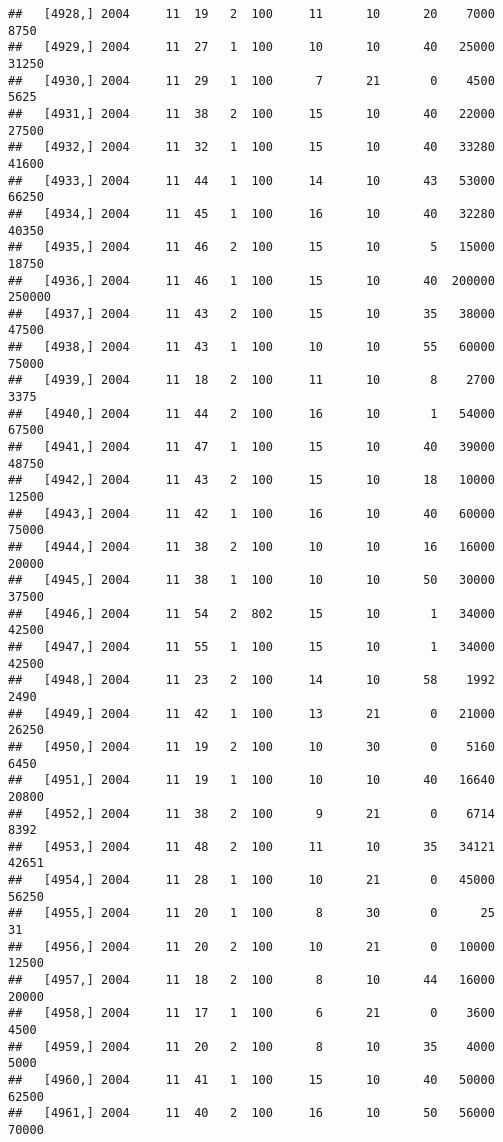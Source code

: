 \documentclass{article}\usepackage[]{graphicx}\usepackage[]{color}
\makeatletter
\newenvironment{kframe}{%
 \def\at@end@of@kframe{}%
 \ifinner\ifhmode%
  \def\at@end@of@kframe{\end{minipage}}%
  \begin{minipage}{\columnwidth}%
 \fi\fi%
 \def\FrameCommand##1{\hskip\@totalleftmargin \hskip-\fboxsep
 \colorbox{shadecolor}{##1}\hskip-\fboxsep
     \hskip-\linewidth \hskip-\@totalleftmargin \hskip\columnwidth}%
 \MakeFramed {\advance\hsize-\width
   \@totalleftmargin\z@ \linewidth\hsize
   \@setminipage}}%
 {\par\unskip\endMakeFramed%
 \at@end@of@kframe}
\newenvironment{knitrout}{}{} %
\makeatother
\begin{document}
\begin{knitrout}
\begin{kframe}
\begin{verbatim}
##   [4928,] 2004     11  19   2  100     11      10      20    7000    8750
##   [4929,] 2004     11  27   1  100     10      10      40   25000   31250
##   [4930,] 2004     11  29   1  100      7      21       0    4500    5625
##   [4931,] 2004     11  38   2  100     15      10      40   22000   27500
##   [4932,] 2004     11  32   1  100     15      10      40   33280   41600
##   [4933,] 2004     11  44   1  100     14      10      43   53000   66250
##   [4934,] 2004     11  45   1  100     16      10      40   32280   40350
##   [4935,] 2004     11  46   2  100     15      10       5   15000   18750
##   [4936,] 2004     11  46   1  100     15      10      40  200000  250000
##   [4937,] 2004     11  43   2  100     15      10      35   38000   47500
##   [4938,] 2004     11  43   1  100     10      10      55   60000   75000
##   [4939,] 2004     11  18   2  100     11      10       8    2700    3375
##   [4940,] 2004     11  44   2  100     16      10       1   54000   67500
##   [4941,] 2004     11  47   1  100     15      10      40   39000   48750
##   [4942,] 2004     11  43   2  100     15      10      18   10000   12500
##   [4943,] 2004     11  42   1  100     16      10      40   60000   75000
##   [4944,] 2004     11  38   2  100     10      10      16   16000   20000
##   [4945,] 2004     11  38   1  100     10      10      50   30000   37500
##   [4946,] 2004     11  54   2  802     15      10       1   34000   42500
##   [4947,] 2004     11  55   1  100     15      10       1   34000   42500
##   [4948,] 2004     11  23   2  100     14      10      58    1992    2490
##   [4949,] 2004     11  42   1  100     13      21       0   21000   26250
##   [4950,] 2004     11  19   2  100     10      30       0    5160    6450
##   [4951,] 2004     11  19   1  100     10      10      40   16640   20800
##   [4952,] 2004     11  38   2  100      9      21       0    6714    8392
##   [4953,] 2004     11  48   2  100     11      10      35   34121   42651
##   [4954,] 2004     11  28   1  100     10      21       0   45000   56250
##   [4955,] 2004     11  20   1  100      8      30       0      25      31
##   [4956,] 2004     11  20   2  100     10      21       0   10000   12500
##   [4957,] 2004     11  18   2  100      8      10      44   16000   20000
##   [4958,] 2004     11  17   1  100      6      21       0    3600    4500
##   [4959,] 2004     11  20   2  100      8      10      35    4000    5000
##   [4960,] 2004     11  41   1  100     15      10      40   50000   62500
##   [4961,] 2004     11  40   2  100     16      10      50   56000   70000

\end{verbatim}
\end{kframe}
\end{knitrout}
\end{document}
